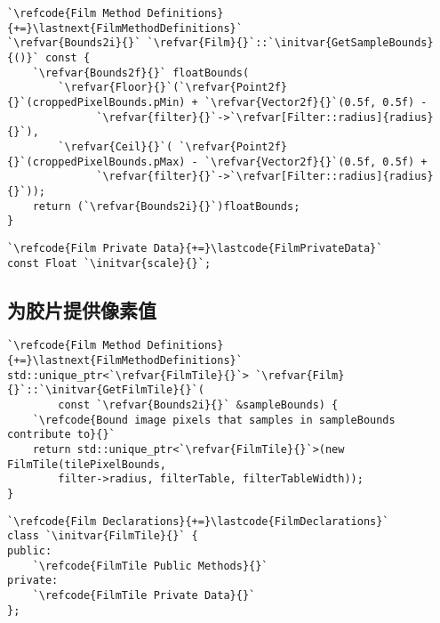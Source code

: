 \begin{lstlisting}
`\refcode{Film Method Definitions}{+=}\lastnext{FilmMethodDefinitions}`
`\refvar{Bounds2i}{}` `\refvar{Film}{}`::`\initvar{GetSampleBounds}{()}` const {
    `\refvar{Bounds2f}{}` floatBounds(
        `\refvar{Floor}{}`(`\refvar{Point2f}{}`(croppedPixelBounds.pMin) + `\refvar{Vector2f}{}`(0.5f, 0.5f) -
              `\refvar{filter}{}`->`\refvar[Filter::radius]{radius}{}`),
        `\refvar{Ceil}{}`( `\refvar{Point2f}{}`(croppedPixelBounds.pMax) - `\refvar{Vector2f}{}`(0.5f, 0.5f) +
              `\refvar{filter}{}`->`\refvar[Filter::radius]{radius}{}`));
    return (`\refvar{Bounds2i}{}`)floatBounds;
}
\end{lstlisting}

\begin{lstlisting}
`\refcode{Film Private Data}{+=}\lastcode{FilmPrivateData}`
const Float `\initvar{scale}{}`;
\end{lstlisting}

\subsection{为胶片提供像素值}\label{sub:为胶片提供像素值}
\begin{lstlisting}
`\refcode{Film Method Definitions}{+=}\lastnext{FilmMethodDefinitions}`
std::unique_ptr<`\refvar{FilmTile}{}`> `\refvar{Film}{}`::`\initvar{GetFilmTile}{}`(
        const `\refvar{Bounds2i}{}` &sampleBounds) {
    `\refcode{Bound image pixels that samples in sampleBounds contribute to}{}`
    return std::unique_ptr<`\refvar{FilmTile}{}`>(new FilmTile(tilePixelBounds,
        filter->radius, filterTable, filterTableWidth));
}
\end{lstlisting}

\begin{lstlisting}
`\refcode{Film Declarations}{+=}\lastcode{FilmDeclarations}`
class `\initvar{FilmTile}{}` {
public:
    `\refcode{FilmTile Public Methods}{}`
private:
    `\refcode{FilmTile Private Data}{}`
};
\end{lstlisting}